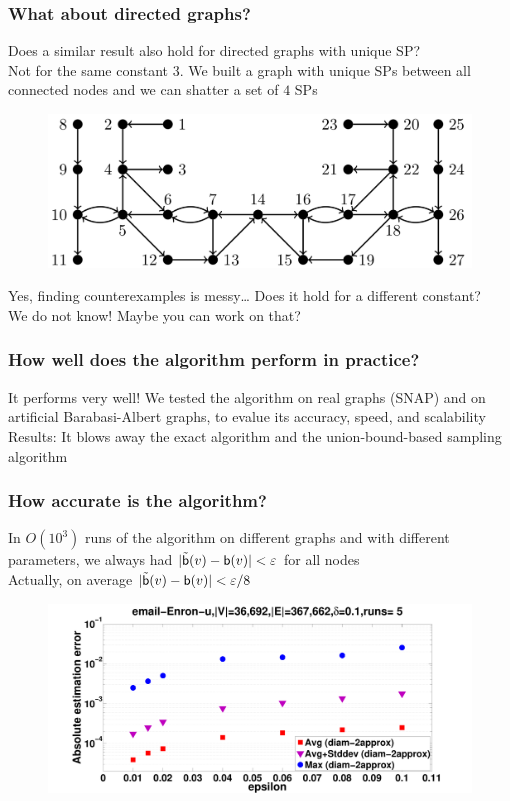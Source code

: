 \begin{frame}
  \frametitle{What about directed graphs?}
  Does a similar result also hold for directed graphs with unique SP?\\
  \quad  Not for the same constant $3$. We built a graph with unique SPs between
  all connected nodes and we can shatter a set of $4$ SPs
  \begin{figure}[H]
    \centering
    \includegraphics[scale=0.3]{imgs/uniquedirected.pdf}
  \end{figure}
  Yes, finding counterexamples is messy\ldots
  \vfill
  Does it hold for a different constant?\\
  \quad We do not know! Maybe you can work on that?
\end{frame}

\begin{frame}
  \frametitle{How well does the algorithm perform in practice?}
  It performs very well!
  \vfill
  We tested the algorithm on real graphs (SNAP) and on artificial
  Barabasi-Albert graphs, to evalue its accuracy, speed, and scalability
  \vfill
  Results: It blows away the exact algorithm and the union-bound-based
  sampling algorithm
\end{frame}

\begin{frame}
  \frametitle{How accurate is the algorithm?}
  In $O(10^3)$ runs of the algorithm on different graphs and with different
  parameters, we always had $|\tilde{\mathsf{b}}(v)-\mathsf{b}(v)|<\varepsilon$ for all
  nodes\\
  \quad Actually, on average $|\tilde{\mathsf{b}}(v)-\mathsf{b}(v)|<\varepsilon/8$
  \vfill
  \begin{figure}[H]
    \centering
    \includegraphics[width=\textwidth]{imgs/email-Enron-error.pdf}
  \end{figure}
\end{frame}


